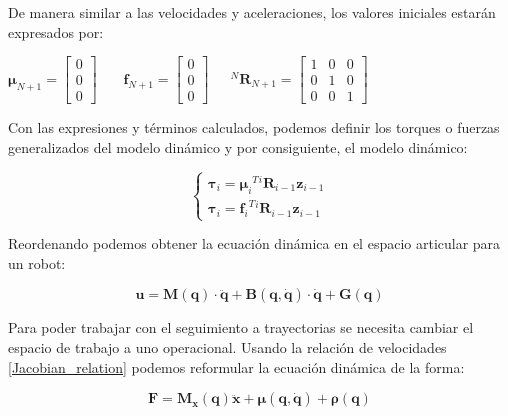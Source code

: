 De manera similar a las velocidades y aceleraciones, los valores iniciales
estarán expresados por:

$\boldsymbol{\mu}_{N+1} = \begin{bmatrix}
        0 \\0\\0
    \end{bmatrix}$ \ \ \ $\boldsymbol{f}_{N+1} = \begin{bmatrix}
        0 \\0\\0
    \end{bmatrix}$\ \ \ $^N\boldsymbol{R}_{N+1} = \begin{bmatrix}
        1 & 0 & 0 \\0&1&0\\0&0&1
    \end{bmatrix}$

Con las expresiones y términos calculados, podemos definir los torques o
fuerzas generalizados del modelo dinámico y por consiguiente, el modelo
dinámico:

\begin{equation}
    \begin{cases}
        \boldsymbol{\tau}_i = {\boldsymbol{\mu}_i}^T
        {^{i}\boldsymbol{R}_{i-1}} \boldsymbol{z}_{i-1} \\
        \boldsymbol{\tau}_i = {\boldsymbol{f}_i}^T
        {^{i}\boldsymbol{R}_{i-1}} \boldsymbol{z}_{i-1}
    \end{cases}
    \label{eq:EcuacionDinamica}
\end{equation}

Reordenando podemos obtener la ecuación dinámica en el espacio articular
para un robot:

\begin{equation}
    \boldsymbol{u} =
    \boldsymbol{M}(\boldsymbol{q})\cdot\boldsymbol{\ddot{q}}+\boldsymbol{B}(\boldsymbol{q},\boldsymbol{\dot{q}})\cdot\boldsymbol{\dot{q}}+\boldsymbol{G}(\boldsymbol{q})
\end{equation}

Para poder trabajar con el seguimiento a trayectorias se necesita cambiar
el espacio de trabajo a uno operacional. Usando la relación de velocidades
\ref{Jacobian_relation} podemos reformular la ecuación dinámica de la forma:

\begin{equation}
    \boldsymbol{F} = \boldsymbol{M_x}(\boldsymbol{q})\boldsymbol{\ddot{x}} + \boldsymbol{\mu}(\boldsymbol{q}, \boldsymbol{\dot{q}}) + \boldsymbol{\rho}(\boldsymbol{q})
    \label{eq:dinamica_operacional}
\end{equation}

